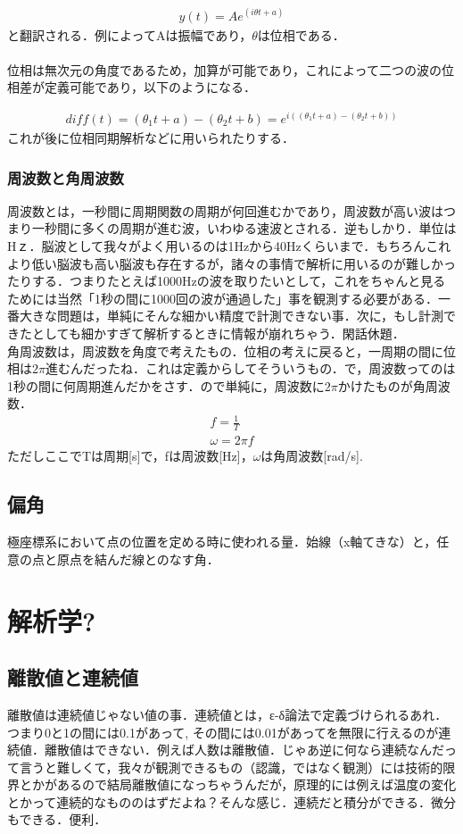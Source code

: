 \documentclass[11pt,a4paper]{jreport}
\begin{document}
\begin{eqnarray}
y(t) = Ae^{(i\theta t + a)}
\end{eqnarray}
と翻訳される．例によってAは振幅であり，$\theta$は位相である．\\
\\
位相は無次元の角度であるため，加算が可能であり，これによって二つの波の位相差が定義可能であり，以下のようになる．

\begin{eqnarray}
diff(t) = (\theta_1 t +a) - (\theta_2 t + b) =e^{i((\theta_1 t+a) - (\theta_2 t+b))}
\end{eqnarray}
これが後に位相同期解析などに用いられたりする．
\subsection{周波数と角周波数}
周波数とは，一秒間に周期関数の周期が何回進むかであり，周波数が高い波はつまり一秒間に多くの周期が進む波，いわゆる速波とされる．逆もしかり．単位はHｚ．脳波として我々がよく用いるのは1Hzから40Hzくらいまで．もちろんこれより低い脳波も高い脳波も存在するが，諸々の事情で解析に用いるのが難しかったりする．つまりたとえば1000Hzの波を取りたいとして，これをちゃんと見るためには当然「1秒の間に1000回の波が通過した」事を観測する必要がある．一番大きな問題は，単純にそんな細かい精度で計測できない事．次に，もし計測できたとしても細かすぎて解析するときに情報が崩れちゃう．閑話休題．\\
角周波数は，周波数を角度で考えたもの．位相の考えに戻ると，一周期の間に位相は$2\pi$進むんだったね．これは定義からしてそういうもの．で，周波数ってのは1秒の間に何周期進んだかをさす．ので単純に，周波数に$2\pi$かけたものが角周波数．
\begin{eqnarray}
f = \frac{1}{T}\\
\omega = 2\pi f
\end{eqnarray}
ただしここでTは周期[s]で，fは周波数[Hz]，$\omega$は角周波数[rad/s].
\section{偏角}
極座標系において点の位置を定める時に使われる量．始線（x軸てきな）と，任意の点と原点を結んだ線とのなす角．

\chapter{解析学?}
\section{離散値と連続値}
離散値は連続値じゃない値の事．連続値とは，ε-δ論法で定義づけられるあれ．つまり0と1の間には0.1があって, その間には0.01があってを無限に行えるのが連続値．離散値はできない．例えば人数は離散値．じゃあ逆に何なら連続なんだって言うと難しくて，我々が観測できるもの（認識，ではなく観測）には技術的限界とかがあるので結局離散値になっちゃうんだが，原理的には例えば温度の変化とかって連続的なもののはずだよね？そんな感じ．連続だと積分ができる．微分もできる．便利．
\end{document}
